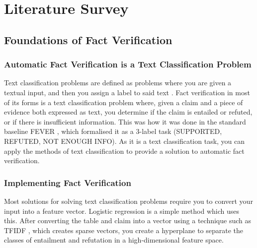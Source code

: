 \chapter{Literature Survey}

\section{Foundations of Fact Verification}

\subsection{Automatic Fact Verification is a Text Classification Problem}
Text classification problems are defined as problems where you are given a textual input, and then you assign a label to said text \parencite{minaee2021deep}. Fact verification in most of its forms is a text classification problem where, given a claim and a piece of evidence both expressed as text, you determine if the claim is entailed or refuted, or if there is insufficient information. This was how it was done in the standard baseline FEVER \parencite{thorne2018fever}, which formalised it as a 3-label task (SUPPORTED, REFUTED, NOT ENOUGH INFO). As it is a text classification task, you can apply the methods of text classification to provide a solution to automatic fact verification.

\subsection{Implementing Fact Verification}
Most solutions for solving text classification problems require you to convert your input into a feature vector. Logistic regression \parencite{cox1958regression} is a simple method which uses this. After converting the table and claim into a vector using a technique such as TFIDF \parencite{salton1988term}, which creates sparse vectors, you create a hyperplane to separate the classes of entailment and refutation in a high-dimensional feature space.

